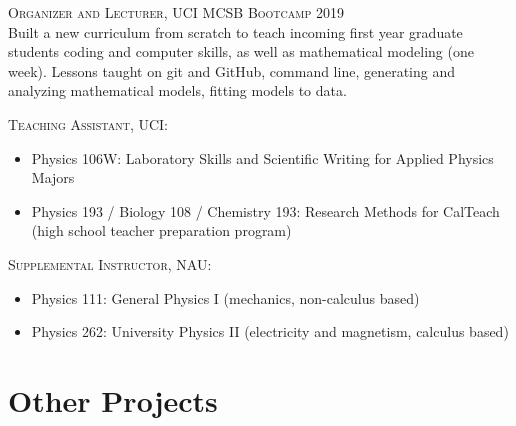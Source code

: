 \documentclass[letterpaper,10pt]{article} %
\begin{document}
\begin{description}

\item \textsc{Organizer and Lecturer, UCI MCSB Bootcamp 2019}
 \\ Built a new curriculum from scratch to teach incoming first year graduate students coding and computer skills, as well as mathematical modeling (one week). Lessons taught on git and GitHub, command line, generating and analyzing mathematical models, fitting models to data.
 
\item \textsc{Teaching Assistant, UCI:}
\begin{itemize}
\item Physics 106W: Laboratory Skills and Scientific Writing for Applied Physics Majors
\item Physics 193 / Biology 108 / Chemistry 193: Research Methods for CalTeach (high school
teacher preparation program)
\end{itemize}

\item \textsc{Supplemental Instructor, NAU:}
\begin{itemize}
\item Physics 111: General Physics I (mechanics, non-calculus based)
\item Physics 262: University Physics II (electricity and magnetism, calculus based)
\end{itemize}

\end{description}

\bigskip
\section{Other Projects}
\bigskip
\end{document}
